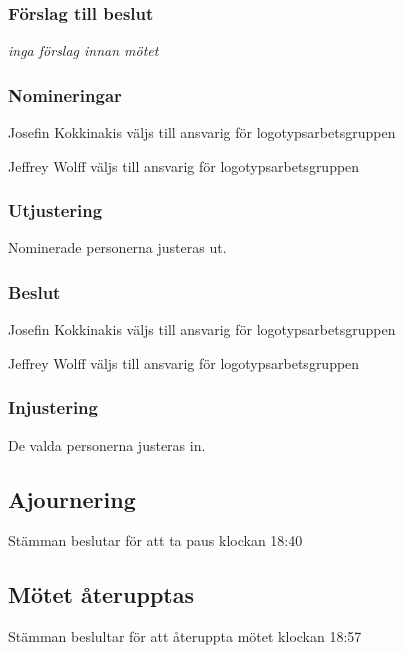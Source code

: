 \documentclass[protokoll]{dvd}
\begin{document}
    \subsubsection*{Förslag till beslut}
        \begin{attsatser}
            \item \emph{inga förslag innan mötet}
        \end{attsatser}

    \subsubsection*{Nomineringar}
        \begin{attsatser}
            \item Josefin Kokkinakis väljs till ansvarig för logotypsarbetsgruppen
            \item Jeffrey Wolff väljs till ansvarig för logotypsarbetsgruppen
        \end{attsatser}

        \subsubsection*{Utjustering}
        Nominerade personerna justeras ut.

    \subsubsection*{Beslut}
        \begin{attsatser}
            \item Josefin Kokkinakis väljs till ansvarig för logotypsarbetsgruppen
            \item Jeffrey Wolff väljs till ansvarig för logotypsarbetsgruppen
        \end{attsatser}

    \subsubsection*{Injustering}
        De valda personerna justeras in.

\newpage

\subsection{Ajournering}
    Stämman beslutar för att ta paus klockan 18:40

\subsection{Mötet återupptas}
    Stämman beslultar för att återuppta mötet klockan 18:57
\end{document}
